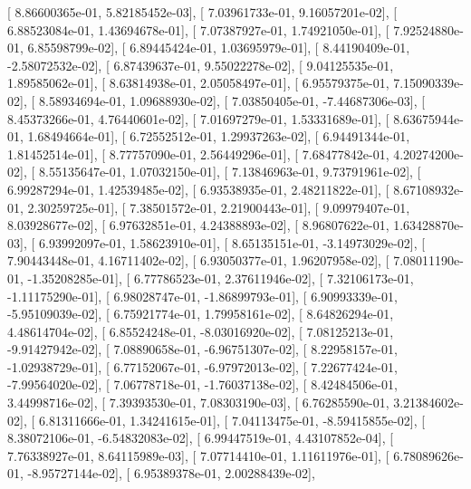 \documentclass{article}
\begin{document}
       [  8.86600365e-01,   5.82185452e-03],
       [  7.03961733e-01,   9.16057201e-02],
       [  6.88523084e-01,   1.43694678e-01],
       [  7.07387927e-01,   1.74921050e-01],
       [  7.92524880e-01,   6.85598799e-02],
       [  6.89445424e-01,   1.03695979e-01],
       [  8.44190409e-01,  -2.58072532e-02],
       [  6.87439637e-01,   9.55022278e-02],
       [  9.04125535e-01,   1.89585062e-01],
       [  8.63814938e-01,   2.05058497e-01],
       [  6.95579375e-01,   7.15090339e-02],
       [  8.58934694e-01,   1.09688930e-02],
       [  7.03850405e-01,  -7.44687306e-03],
       [  8.45373266e-01,   4.76440601e-02],
       [  7.01697279e-01,   1.53331689e-01],
       [  8.63675944e-01,   1.68494664e-01],
       [  6.72552512e-01,   1.29937263e-02],
       [  6.94491344e-01,   1.81452514e-01],
       [  8.77757090e-01,   2.56449296e-01],
       [  7.68477842e-01,   4.20274200e-02],
       [  8.55135647e-01,   1.07032150e-01],
       [  7.13846963e-01,   9.73791961e-02],
       [  6.99287294e-01,   1.42539485e-02],
       [  6.93538935e-01,   2.48211822e-01],
       [  8.67108932e-01,   2.30259725e-01],
       [  7.38501572e-01,   2.21900443e-01],
       [  9.09979407e-01,   8.03928677e-02],
       [  6.97632851e-01,   4.24388893e-02],
       [  8.96807622e-01,   1.63428870e-03],
       [  6.93992097e-01,   1.58623910e-01],
       [  8.65135151e-01,  -3.14973029e-02],
       [  7.90443448e-01,   4.16711402e-02],
       [  6.93050377e-01,   1.96207958e-02],
       [  7.08011190e-01,  -1.35208285e-01],
       [  6.77786523e-01,   2.37611946e-02],
       [  7.32106173e-01,  -1.11175290e-01],
       [  6.98028747e-01,  -1.86899793e-01],
       [  6.90993339e-01,  -5.95109039e-02],
       [  6.75921774e-01,   1.79958161e-02],
       [  8.64826294e-01,   4.48614704e-02],
       [  6.85524248e-01,  -8.03016920e-02],
       [  7.08125213e-01,  -9.91427942e-02],
       [  7.08890658e-01,  -6.96751307e-02],
       [  8.22958157e-01,  -1.02938729e-01],
       [  6.77152067e-01,  -6.97972013e-02],
       [  7.22677424e-01,  -7.99564020e-02],
       [  7.06778718e-01,  -1.76037138e-02],
       [  8.42484506e-01,   3.44998716e-02],
       [  7.39393530e-01,   7.08303190e-03],
       [  6.76285590e-01,   3.21384602e-02],
       [  6.81311666e-01,   1.34241615e-01],
       [  7.04113475e-01,  -8.59415855e-02],
       [  8.38072106e-01,  -6.54832083e-02],
       [  6.99447519e-01,   4.43107852e-04],
       [  7.76338927e-01,   8.64115989e-03],
       [  7.07714410e-01,   1.11611976e-01],
       [  6.78089626e-01,  -8.95727144e-02],
       [  6.95389378e-01,   2.00288439e-02],
\end{document}
